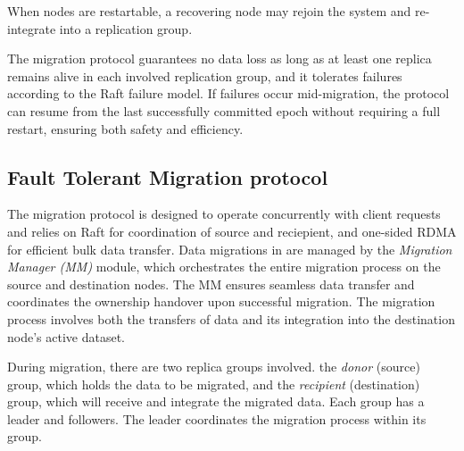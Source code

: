 When nodes are restartable, a recovering node may rejoin the system and re-integrate into a replication group. 


The migration protocol guarantees no data loss as long as at least one replica remains alive in each involved replication group, 
and it tolerates failures according to the Raft failure model. 
If failures occur mid-migration, the protocol can resume from the last successfully committed epoch without requiring a full restart, ensuring both safety and efficiency.


\subsection{Fault Tolerant Migration protocol}
\label{sec:migration-protocol}

The migration protocol is designed to operate concurrently with client requests and relies on Raft for coordination of source and reciepient, 
and one-sided RDMA for efficient bulk data transfer.
Data migrations in \OurImplementation{} are managed by the \emph{Migration Manager (MM)} module, which orchestrates the entire migration process on the source and destination nodes. 
The MM ensures seamless data transfer and coordinates the ownership handover upon successful migration. 
The migration process involves both the transfers of data and its integration into the destination node’s active dataset. 

During migration, there are two replica groups involved.
the \emph{donor} (source) group, which holds the data to be migrated, and the \emph{recipient} (destination) group, 
which will receive and integrate the migrated data. Each group has a leader and followers. The leader coordinates the migration process within its group.

